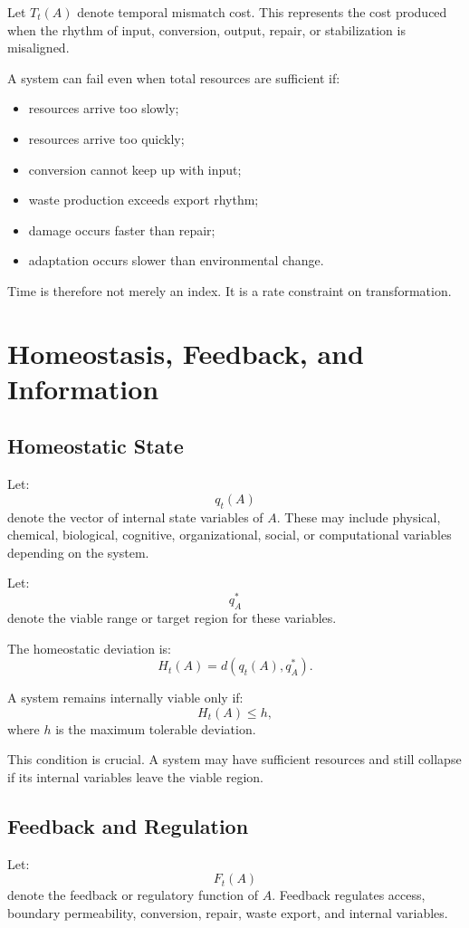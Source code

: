 \documentclass[11pt,a4paper]{article}
\begin{document}
Let $T_t(A)$ denote temporal mismatch cost. This represents the cost produced when the rhythm of input, conversion, output, repair, or stabilization is misaligned.

A system can fail even when total resources are sufficient if:
\begin{itemize}[leftmargin=2em]
\item resources arrive too slowly;
\item resources arrive too quickly;
\item conversion cannot keep up with input;
\item waste production exceeds export rhythm;
\item damage occurs faster than repair;
\item adaptation occurs slower than environmental change.
\end{itemize}

Time is therefore not merely an index. It is a rate constraint on transformation.

\section{Homeostasis, Feedback, and Information}

\subsection{Homeostatic State}

Let:
\[
q_t(A)
\]
denote the vector of internal state variables of $A$. These may include physical, chemical, biological, cognitive, organizational, social, or computational variables depending on the system.

Let:
\[
q_A^*
\]
denote the viable range or target region for these variables.

The homeostatic deviation is:
\[
H_t(A)=d(q_t(A),q_A^*).
\]

A system remains internally viable only if:
\[
H_t(A)\leq h,
\]
where $h$ is the maximum tolerable deviation.

This condition is crucial. A system may have sufficient resources and still collapse if its internal variables leave the viable region.

\subsection{Feedback and Regulation}

Let:
\[
F_t(A)
\]
denote the feedback or regulatory function of $A$. Feedback regulates access, boundary permeability, conversion, repair, waste export, and internal variables.
\end{document}
